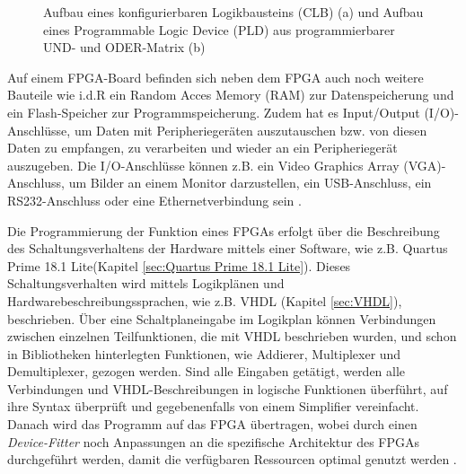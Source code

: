 \documentclass[ngerman,12pt]{article} %
\begin{document}
\begin{figure}[h!tb]
  \centering
  \qquad
  \caption[Aufbau eines konfigurierbaren Logikbausteins und eines Programmable Logic Device ]{\label{pic:CLB_PLD}Aufbau eines konfigurierbaren Logikbausteins (CLB) \cite{microcontrollerslab.com} (a) und Aufbau eines Programmable Logic Device (PLD) aus programmierbarer UND- und ODER-Matrix \cite{Upegui}(b)}
\end{figure}

Auf einem FPGA-Board befinden sich neben dem FPGA auch noch weitere Bauteile wie i.d.R ein Random Acces Memory (RAM) zur Datenspeicherung und ein Flash-Speicher zur Programmspeicherung. Zudem hat es Input/Output (I/O)-Anschlüsse, um Daten mit Peripheriegeräten auszutauschen bzw. von diesen Daten zu empfangen, zu verarbeiten und wieder an ein Peripheriegerät auszugeben. Die I/O-Anschlüsse können z.B. ein Video Graphics Array (VGA)-Anschluss, um Bilder an einem Monitor darzustellen, ein USB-Anschluss, ein  RS232-Anschluss oder eine Ethernetverbindung sein \cite{Tietze}.\newline %

Die Programmierung der Funktion eines FPGAs erfolgt über die Beschreibung des Schaltungsverhaltens der Hardware mittels einer Software, wie z.B. Quartus Prime 18.1 Lite(Kapitel \ref{sec:Quartus Prime 18.1 Lite}). Dieses Schaltungsverhalten wird mittels Logikplänen und Hardwarebeschreibungssprachen, wie z.B. VHDL (Kapitel \ref {sec:VHDL}), beschrieben. Über eine Schaltplaneingabe im Logikplan können Verbindungen zwischen einzelnen Teilfunktionen, die mit VHDL beschrieben wurden, und schon in Bibliotheken hinterlegten Funktionen, wie Addierer, Multiplexer und Demultiplexer, gezogen werden. Sind alle Eingaben getätigt, werden alle Verbindungen und VHDL-Beschreibungen in logische Funktionen überführt, auf ihre Syntax überprüft und gegebenenfalls von einem Simplifier vereinfacht. Danach wird das Programm auf das FPGA übertragen, wobei durch einen \textit{Device-Fitter} noch Anpassungen an die spezifische Architektur des FPGAs durchgeführt werden, damit die verfügbaren Ressourcen optimal genutzt werden \cite{Tietze}. %
\end{document}
